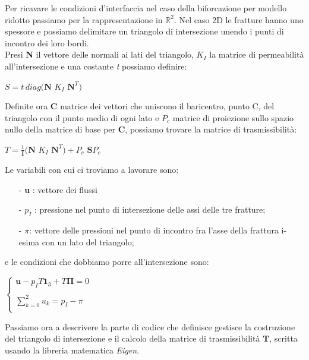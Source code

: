 Per ricavare le condizioni d'interfaccia nel caso della biforcazione per modello ridotto passiamo per la rappresentazione in $\mathbb{R}^{2}$.
Nel caso 2D le fratture hanno uno spessore e possiamo delimitare un triangolo di intersezione unendo i punti di incontro dei loro bordi. \\
Presi \textbf{N} il vettore delle normali ai lati del triangolo, \textbf{$K_{I}$} la matrice di permeabilit\`{a} all'intersezione e una costante \textit{t} possiamo definire:
\begin{center}
	$ S = \textit{t} \, diag( \textbf{N}$ \textbf{$K_{I}$} $ \textbf{N}^{T} ) $
\end{center}
Definite ora \textbf{C} matrice dei vettori che uniscono il baricentro, punto C, del triangolo con il punto medio  di ogni lato e \textbf{$P_{c}$} matrice di proiezione sullo spazio nullo della matrice di base per \textbf{C}, possiamo trovare la matrice di trasmissibilit\`{a}:
\begin{center}
	$ T = \frac{1}{\textbf{I}}( \textbf{N}$ \textbf{$K_{I}$} $ \textbf{N}^{T} ) + $\textbf{$P_{c}$} $\textbf{S}$\textbf{$P_{c}$}
\end{center}
Le variabili con cui ci troviamo a lavorare sono:
	\begin{enumerate}
	\item[-] \textbf{u} : vettore dei flussi
	\item[-] $p_{I}$ :  pressione nel punto di intersezione delle assi delle tre fratture;
	\item[-] \textbf{$\pi$}: vettore delle pressioni nel punto di incontro fra l'asse della frattura i-esima con un lato del triangolo;
	\end{enumerate} 
e le condizioni che dobbiamo porre all'intersezione sono:
\begin{center}			
	$\left \{
		\begin{array}{l}	
	 		\textbf{u} - p_{I}T\textbf{1}_{3}+T \boldsymbol{\Pi}=0  \\ \\
     	 	\displaystyle \sum_{k=0}^2 u_{k} = p_{I} - \pi  \\
		\end{array}
	\right.$
\end{center} \label{condizioni d'interfaccia}

\par Passiamo ora a descrivere la parte di codice che definisce gestisce la costruzione del triangolo di intersezione e il calcolo della matrice di trasmissibilità $\textbf{T}$, scritta usando la libreria matematica \textit{Eigen}.\\

